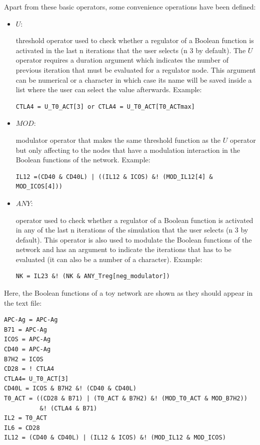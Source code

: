 \documentclass[a4paper]{article}
\begin{document}
Apart from these basic operators, some convenience operations have been defined:
\begin{itemize}

\item{$U$:}{ threshold operator used to check whether a regulator of a Boolean function is activated in the last n iterations that the user selects (n 3 by default). The $U$ operator requires a duration argument which indicates the number of previous iteration that must be evaluated for a regulator node. This argument can be numerical or a character in which case its name will be saved inside a list where the user can select the value afterwards. Example: 

\begin{verbatim}
CTLA4 = U_T0_ACT[3] or CTLA4 = U_T0_ACT[T0_ACTmax] 
 \end{verbatim}
}
 
\item{$MOD$:}{ modulator operator that makes the same threshold function as the $U$ operator but only affecting to the nodes that have a modulation interaction in the Boolean functions of the network.
Example: 

\begin{verbatim}
IL12 =(CD40 & CD40L) | ((IL12 & ICOS) &! (MOD_IL12[4] & MOD_ICOS[4]))
 \end{verbatim}
}
 
\item{$ANY$:}{ operator used to check whether a regulator of a Boolean function is activated in any of the last n iterations of the simulation that the user selects (n 3 by default). This operator is also used to modulate the Boolean functions of the network and has an argument to indicate the iterations that has to be evaluated (it can also be a number of a character). Example:
\begin{verbatim}
NK = IL23 &! (NK & ANY_Treg[neg_modulator])
\end{verbatim}
}
\end{itemize}



Here, the Boolean functions of a toy network are shown as they should appear in the text file:
\begin{framed}
\begin{verbatim}
APC-Ag = APC-Ag
B71 = APC-Ag
ICOS = APC-Ag
CD40 = APC-Ag
B7H2 = ICOS
CD28 = ! CTLA4
CTLA4= U_T0_ACT[3]
CD40L = ICOS & B7H2 &! (CD40 & CD40L)
T0_ACT = ((CD28 & B71) | (T0_ACT & B7H2) &! (MOD_T0_ACT & MOD_B7H2)) 
          &! (CTLA4 & B71)
IL2 = T0_ACT
IL6 = CD28
IL12 = (CD40 & CD40L) | (IL12 & ICOS) &! (MOD_IL12 & MOD_ICOS)
\end{verbatim}
\end{framed}
\end{document}
